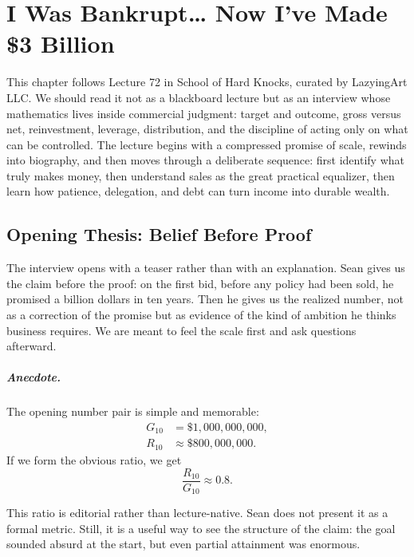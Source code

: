 \chapter{I Was Bankrupt\ldots{} Now I've Made \$3 Billion}

This chapter follows Lecture 72 in School of Hard Knocks, curated by LazyingArt LLC. We should read it not as a blackboard lecture but as an interview whose mathematics lives inside commercial judgment: target and outcome, gross versus net, reinvestment, leverage, distribution, and the discipline of acting only on what can be controlled. The lecture begins with a compressed promise of scale, rewinds into biography, and then moves through a deliberate sequence: first identify what truly makes money, then understand sales as the great practical equalizer, then learn how patience, delegation, and debt can turn income into durable wealth.

\section{Opening Thesis: Belief Before Proof}

The interview opens with a teaser rather than with an explanation. Sean gives us the claim before the proof: on the first bid, before any policy had been sold, he promised a billion dollars in ten years. Then he gives us the realized number, not as a correction of the promise but as evidence of the kind of ambition he thinks business requires. We are meant to feel the scale first and ask questions afterward.

\paragraph{Anecdote.}
The opening number pair is simple and memorable:
\begin{align}
G_{10} &= \$1{,}000{,}000{,}000,\\
R_{10} &\approx \$800{,}000{,}000.
\end{align}
If we form the obvious ratio, we get
\begin{equation}
\frac{R_{10}}{G_{10}} \approx 0.8.
\end{equation}

\begin{remark}
This ratio is editorial rather than lecture-native. Sean does not present it as a formal metric. Still, it is a useful way to see the structure of the claim: the goal sounded absurd at the start, but even partial attainment was enormous.
\end{remark}

